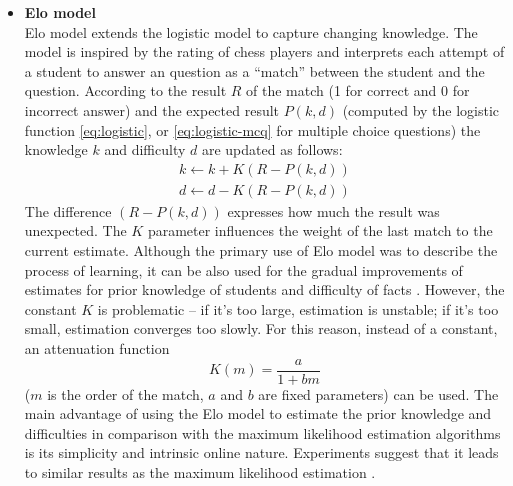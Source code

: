 \documentclass[12pt, twoside]{fithesis2}		%
\renewcommand{\_}{\leavevmode \kern0.07em\vbox{\hrule width0.4em}}
\newcommand{\squarebullet}{\textcolor{black}{\raisebox{0.15em}{\rule{4pt}{4pt}}}}
\newcommand{\emptysquarebullet}{\textcolor{black}{\raisebox{0.10em}{\tiny$\square$}}}
\newenvironment{myItemize}{
  \begin{itemize}[leftmargin=2em,rightmargin=1em,itemsep=\parskip ,parsep=0em,topsep=0em,partopsep=0em]
  \renewcommand{\labelitemi}{\squarebullet}
  \renewcommand{\labelitemii}{\textbullet}
}{
  \end{itemize}
}
\newcounter{choice}
\begin{document}
\begin{myItemize}
\item \textbf{Elo model}\\
  Elo model extends the logistic model to capture changing knowledge.
  The model is inspired by the rating of chess players \cite{elo-rating} and interprets each attempt of a student to answer an question as a ``match'' between the student and the question.
  According to the result $R$ of the match (1 for correct and 0 for incorrect answer)
  and the expected result $P(k, d)$
  (computed by the logistic function \ref{eq:logistic}, or \ref{eq:logistic-mcq} for multiple choice questions)
  the knowledge $k$ and difficulty $d$ are updated as follows:
  \begin{equation}\label{eq:elo}
  \begin{array}{l}
      k \gets k + K (R - P(k, d))\\
      d \gets d - K (R - P(k, d))
  \end{array}
  \end{equation}
The difference $(R - P(k, d))$ expresses how much the result was unexpected.
The $K$ parameter influences the weight of the last match to the current estimate.
Although the primary use of Elo model was to describe the process of learning,
it can be also used for the gradual improvements of estimates for prior knowledge of students and difficulty of facts \cite{slepe-mapy}.
However, the constant $K$ is problematic -- if it's too large, estimation is unstable; if it's too small, estimation converges too slowly.
For this reason, instead of a constant, an attenuation function
\begin{equation}\label{eq:attenuation}
  K(m) = \frac{a}{1 + bm}
\end{equation}
($m$ is the order of the match, $a$ and $b$ are fixed parameters) can be used.
The main advantage of using the Elo model to estimate the prior knowledge and difficulties in comparison with the maximum likelihood estimation algorithms is its simplicity and intrinsic online nature.
Experiments suggest that it leads to similar results as the maximum likelihood estimation \cite{slepe-mapy-time-elo}.


\end{myItemize}
\end{document}
